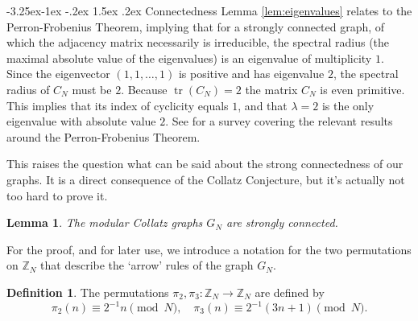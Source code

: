 \documentclass[10pt]{article}
\makeatletter
\renewcommand\subsection{\@startsection{subsection}{2}{\z@}
{-3.25ex\@plus -1ex \@minus -.2ex}
{1.5ex \@plus .2ex}
{\normalfont\normalsize\bfseries\boldmath}}
\newtheorem{lemma}{Lemma}
\theoremstyle{definition}
\newtheorem{definition}{Definition}
\newcommand{\Z}{\mathbb{Z}}
\DeclareMathOperator{\trace}{tr}
\makeatother
\begin{document}
\subsection{Connectedness}
Lemma \ref{lem:eigenvalues} relates to the Perron-Frobenius Theorem, implying that for a
strongly connected graph, of which the adjacency matrix necessarily is irreducible, the spectral radius
(the maximal absolute value of the eigenvalues) is an eigenvalue of multiplicity $ 1 $. Since the
eigenvector $ (1,1,\ldots,1) $ is positive and has eigenvalue $ 2 $, the spectral radius of $ C_N $ must
be $ 2 $. Because $ \trace(C_N) = 2 $ the matrix $ C_N $ is even primitive. This implies that its index
of cyclicity equals $ 1 $, and that $ \lambda = 2 $ is the only eigenvalue with absolute value $ 2 $.
See \cite{BS} for a survey covering the relevant results around the Perron-Frobenius Theorem.

This raises the question what can be said about the strong connectedness of our graphs. It is a
direct consequence of the Collatz Conjecture, but it's actually not too hard to prove it.

\begin{lemma} \label{lem:connected}
    The modular Collatz graphs $ G_N $ are strongly connected.
\end{lemma}

For the proof, and for later use, we introduce a notation for the two permutations on $ \Z_N $ that
describe the `arrow' rules of the graph $ G_N $.

\begin{definition} \label{def:perm}
    The permutations $ \pi_2, \pi_3 : \Z_N \to \Z_N $ are defined by
    \[ \pi_2(n) \equiv 2^{-1} n \pmod{N} , \quad \pi_3(n) \equiv 2^{-1} (3 n + 1) \pmod{N} . \]
\end{definition}
\end{document}
